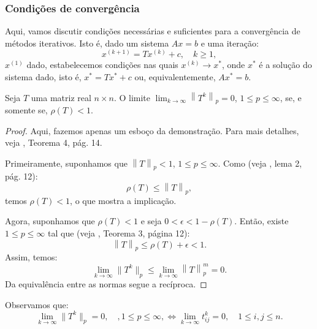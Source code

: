 \subsubsection{Condições de convergência}

Aqui, vamos discutir condições necessárias e suficientes para a convergência de métodos iterativos. Isto é, dado um sistema $Ax = b$ e uma iteração:
\begin{equation}
  x^{(k+1)} = Tx^{(k)} + c,\quad k\geq 1,
\end{equation}
$x^{(1)}$ dado, estabelecemos condições nas quais $x^{(k)}\to x^{*}$, onde $x^*$ é a solução do sistema dado, isto é, $x^* = Tx^* + c$ ou, equivalentemente, $Ax^* = b$.

\begin{lem}\label{lema:matriz_convergente}
  Seja $T$ uma matriz real $n\times n$. O limite $\displaystyle\lim_{k\to\infty} \left \|T^k\right \|_p = 0$, $1\leq p \leq \infty$, se, e somente se, $\rho(T) < 1$.
\end{lem}
\begin{proof}
  Aqui, fazemos apenas um esboço da demonstração. Para mais detalhes, veja \cite{Isaacson1994a}, Teorema 4, pág. 14.

  Primeiramente, suponhamos que $\left\|T\right\|_p < 1$, $1\leq p \leq \infty$. Como (veja \cite{Isaacson1994a}, lema 2, pág. 12):
  \begin{equation}
    \rho(T) \leq \left\|T\right\|_p,
  \end{equation}
temos $\rho(T) < 1$, o que mostra a implicação.

  Agora, suponhamos que $\rho(T) < 1$ e seja $0 < \epsilon < 1 - \rho(T)$. Então, existe $1\leq p \leq \infty$ tal que (veja \cite{Isaacson1994a}, Teorema 3, página 12):
  \begin{equation}
    \left\|T\right\|_p \leq \rho(T) + \epsilon < 1.
  \end{equation}
Assim, temos:
\begin{equation}
  \lim_{k\to\infty} \|T^k\|_p \leq \lim_{k\to\infty} \left\|T\right\|_p^m = 0.
\end{equation}
Da equivalência entre as normas segue a recíproca.
\end{proof}

\begin{obs}\label{obs:matriz_convergente}
  Observamos que:
  \begin{equation}
    \lim_{k\to\infty} \|T^k\|_p = 0,\quad,1\leq p\leq \infty,\Leftrightarrow \lim_{k\to\infty} t_{ij}^k = 0,\quad 1\leq i,j\leq n.
  \end{equation}
\end{obs}

